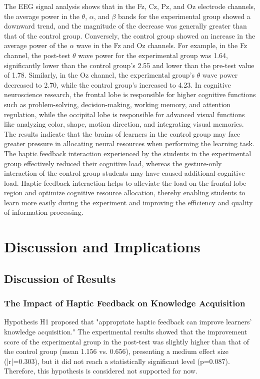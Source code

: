 \documentclass[runningheads]{llncs}
\begin{document}
The EEG signal analysis shows that in the Fz, Cz, Pz, and Oz electrode channels, the average power in the $\theta$, $\alpha$, and $\beta$ bands for the experimental group showed a downward trend, and the magnitude of the decrease was generally greater than that of the control group. Conversely, the control group showed an increase in the average power of the $\alpha$ wave in the Fz and Oz channels. For example, in the Fz channel, the post-test $\theta$ wave power for the experimental group was 1.64, significantly lower than the control group's 2.55 and lower than the pre-test value of 1.78. Similarly, in the Oz channel, the experimental group's $\theta$ wave power decreased to 2.70, while the control group's increased to 4.23.
In cognitive neuroscience research, the frontal lobe is responsible for higher cognitive functions such as problem-solving, decision-making, working memory, and attention regulation, while the occipital lobe is responsible for advanced visual functions like analyzing color, shape, motion direction, and integrating visual memories\cite{kolb2009fundamentals}. The results indicate that the brains of learners in the control group may face greater pressure in allocating neural resources when performing the learning task. The haptic feedback interaction experienced by the students in the experimental group effectively reduced their cognitive load, whereas the gesture-only interaction of the control group students may have caused additional cognitive load. Haptic feedback interaction helps to alleviate the load on the frontal lobe region and optimize cognitive resource allocation, thereby enabling students to learn more easily during the experiment and improving the efficiency and quality of information processing.

\section{Discussion and Implications}
\subsection{Discussion of Results}
\subsubsection{The Impact of Haptic Feedback on Knowledge Acquisition} 
Hypothesis H1 proposed that "appropriate haptic feedback can improve learners' knowledge acquisition." The experimental results showed that the improvement score of the experimental group in the post-test was slightly higher than that of the control group (mean 1.156 vs. 0.656), presenting a medium effect size (|r|=0.303), but it did not reach a statistically significant level (p=0.087). Therefore, this hypothesis is considered not supported for now.
\end{document}
